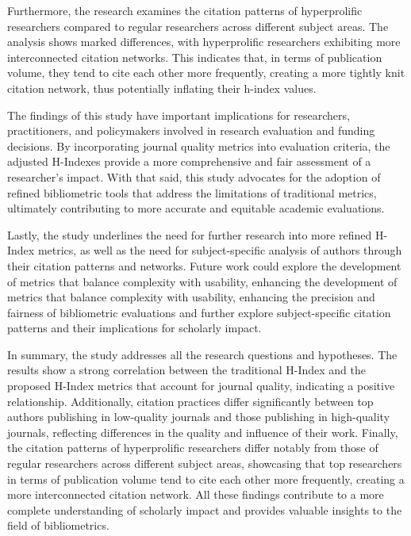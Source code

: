 Furthermore, the research examines the citation patterns of hyperprolific
researchers compared to regular researchers across different subject areas. The
analysis shows marked differences, with hyperprolific researchers exhibiting
more interconnected citation networks. This indicates that, in terms of
publication volume, they tend to cite each other more frequently, creating a
more tightly knit citation network, thus potentially inflating their h-index
values.

The findings of this study have important implications for researchers,
practitioners, and policymakers involved in research evaluation and funding
decisions. By incorporating journal quality metrics into evaluation criteria,
the adjusted H-Indexes provide a more comprehensive and fair assessment of a
researcher’s impact. With that said, this study advocates for the adoption of
refined bibliometric tools that address the limitations of traditional metrics,
ultimately contributing to more accurate and equitable academic evaluations.

Lastly, the study underlines the need for further research into more refined
H-Index metrics, as well as the need for subject-specific analysis of authors
through their citation patterns and networks. Future work could explore the
development of metrics that balance complexity with usability, enhancing the
development of metrics that balance complexity with usability, enhancing the
precision and fairness of bibliometric evaluations and further explore
subject-specific citation patterns and their implications for scholarly impact.

In summary, the study addresses all the research questions and hypotheses. The
results show a strong correlation between the traditional H-Index and the
proposed H-Index metrics that account for journal quality, indicating a
positive relationship. Additionally, citation practices differ significantly
between top authors publishing in low-quality journals and those publishing in
high-quality journals, reflecting differences in the quality and influence of
their work. Finally, the citation patterns of hyperprolific researchers differ
notably from those of regular researchers across different subject areas,
showcasing that top researchers in terms of publication volume tend to cite
each other more frequently, creating a more interconnected citation network.
All these findings contribute to a more complete understanding of scholarly
impact and provides valuable insights to the field of bibliometrics.

